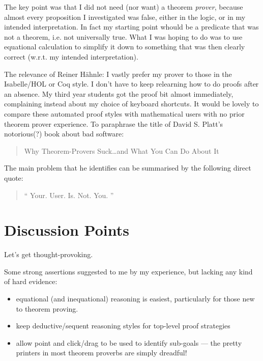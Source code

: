 \documentclass[EPiC]{easychair}
\begin{document}
The key point was that I did not need (nor want) a theorem \emph{prover},
because almost every proposition I investigated was false, either in the logic,
or in my intended interpretation. In fact my starting point whould be
a predicate that was not a theorem, i.e. not universally true.
What I was hoping to do was to use equational calculation to simplify it down to
something that was then clearly correct (w.r.t. my intended interpretation).


The relevance of Reiner H\"{a}hnle\cite{RH:UserExpr:2016}:
I vastly prefer my prover to those in the Isabelle/HOL or Coq style.
I don't have to keep relearning how to do proofs after an absence.
My third year students got the proof bit almost immediately,
complaining instead about my choice of keyboard shortcuts.
It would be lovely to compare these automated proof styles
with mathematical users with no prior theorem prover experience.
To paraphrase the title of David S. Platt's notorious(?) book
about bad software\cite{Platt:2006}:
\begin{quote}
  Why Theorem-Provers Suck\dots and What You Can Do About It
\end{quote}
The main problem that he identifies can be summarised by the following
direct quote:
\begin{quote}
  ``
   Your.
   User.
   Is.
   Not.
   You.
  ''\cite{Platt:2006}
\end{quote}

\section{Discussion Points}

Let's get thought-provoking.

Some strong assertions suggested to me by my experience, but lacking any kind of hard evidence:
\begin{itemize}
  \item
     equational (and inequational) reasoning is easiest, particularly for those new to theorem proving.
  \item
    keep deductive/sequent reasoning styles for top-level proof strategies
  \item
    allow point and click/drag to be used to identify sub-goals
    ---
    the  pretty printers in most theorem proverbs are simply dreadful!
\end{itemize}



\label{sect:bib}

%
%
%



\end{document}
